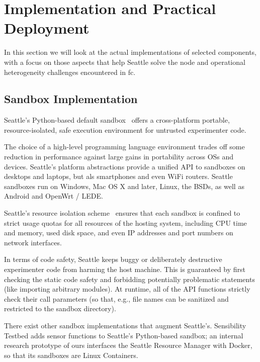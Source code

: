 \section{Implementation and Practical Deployment}

In this section we will look at the actual implementations of
selected components, with a focus on those aspects that help
Seattle solve the node and operational heterogeneity
challenges encountered in \gls{fc}.

\subsection{Sandbox Implementation}

Seattle's Python-based default sandbox~\cite{RepySandbox}
offers a cross-platform portable, resource-isolated,
safe execution environment for untrusted experimenter code.

The choice of a high-level programming language environment trades
off some reduction in performance against large gains in portability
across \glspl{OS} and devices. Seattle's platform abstractions
provide a unified \gls{API} to sandboxes on desktops and laptops,
but als smartphones and even WiFi routers. Seattle sandboxes
run on Windows, Mac OS X and later, Linux, the \glspl{BSD}, as
well as Android and OpenWrt / LEDE.

Seattle's resource isolation scheme~\cite{li2015fence} ensures
that each sandbox is confined to strict usage quotas for all
resources of the hosting system, including \gls{CPU} time and
memory, used disk space, and even \gls{IP} addresses and port numbers
on network interfaces.

In terms of code safety, Seattle keeps buggy or deliberately destructive
experimenter code from harming the host machine. This is guaranteed
by first checking the static code safety and forbidding potentially
problematic statements (like importing arbitrary modules). At runtime,
all of the \gls{API} functions strictly check their call parameters
(so that, e.g., file names can be sanitized and restricted to the
sandbox directory).

There exist other sandbox implementations that augment Seattle's.
Sensibility Testbed adds sensor functions to Seattle's Python-based
sandbox; an internal research prototype of ours interfaces the
Seattle Resource Manager with Docker, so that its sandboxes are
Linux Containers.




